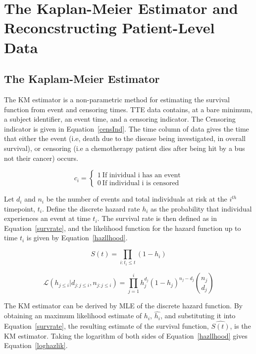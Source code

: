\section{The Kaplan-Meier Estimator and Reconcstructing Patient-Level Data}
\subsection{The Kaplam-Meier Estimator}
The KM estimator is a non-parametric method for estimating the survival function from event and censoring times. TTE data contains, at a bare minimum, a subject identifier, an event time, and a censoring indicator. The Censoring indicator is given in Equation~\ref{censInd}. The time column of data gives the time that either the event (i.e, death due to the disease being investigated, in overall survival), or censoring (i.e a chemotherapy patient dies after being hit by a bus not their cancer) occurs.

\begin{equation}
    c_{i} = \begin{cases}
        1 \ \text{If inividual i has an event} \\
        0 \ \text{If individual i is censored}
    \end{cases}
    \label{censInd}  
\end{equation}

Let $d_i$ and $n_i$ be the number of events and total individuals at risk at the $i^{th}$ timepoint, $t_i$. Define the discrete hazard rate $h_i$ as the probability that individual experiences an event at time $t_i$. The survival rate is then defined as in Equation~\ref{survrate}, and the likelihood function for the hazard function up to time $t_i$ is given by Equation~\ref{hazllhood}.

\begin{equation}
    S(t) = \prod_{i:t_i \leq t} (1 - h_i)
    \label{survrate}
\end{equation}

\begin{equation}
    \mathcal{L}(h_{j\leq i}|d_{j:j\leq i}, n_{j:j\leq i}) = \prod_{j=1}^i h_j^{d_j}(1-h_j)^{n_j-d_j}\binom{n_j}{d_j}
    \label{hazllhood}
\end{equation}

The KM estimator can be derived by MLE of the discrete hazard function. By obtaining an maximum likelihood estimate of $h_i$, $\hat{h_i}$, and substituting it into Equation~\ref{survrate}, the resulting estimate of the survival function, $\hat{S(t)}$, is the KM estimator. Taking the logarithm of both sides of Equation~\ref{hazllhood} gives Equation~\ref{loghazlik}.

